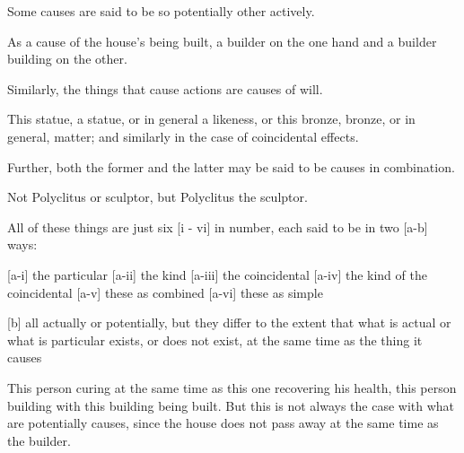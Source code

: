 Some causes are said to be so potentially other actively.

        As a cause of the house's being built, a builder
        on the one hand and a builder building on the other.

Similarly, the things that cause actions are causes of will.

    This statue, a statue, or in general a likeness, or this bronze, bronze,
    or in general, matter; and similarly in the case of coincidental effects.

Further, both the former and the latter may be said to be
causes in combination.

    Not Polyclitus or sculptor, but Polyclitus the sculptor.

All of these things are just six [i - vi] in number,
each said to be in two [a-b] ways:

[a-i]   the particular
[a-ii]  the kind
[a-iii] the coincidental
[a-iv]  the kind of the coincidental
[a-v]   these as combined
[a-vi]  these as simple

[b]     all actually or potentially, but they differ to the extent
        that what is actual or what is particular exists,
        or does not exist, at the same time as the thing it causes

        This person curing at the same time as this one recovering his health,
        this person building with this building being built. But this is not
        always the case with what are potentially causes, since the house does
        not pass away at the same time as the builder.

